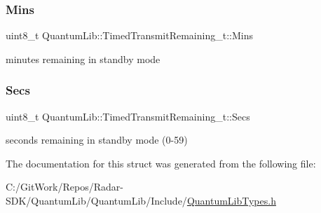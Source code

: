 \subsubsection{\texorpdfstring{Mins}{Mins}}
{\footnotesize\ttfamily uint8\+\_\+t Quantum\+Lib\+::\+Timed\+Transmit\+Remaining\+\_\+t\+::\+Mins}



minutes remaining in standby mode 

\mbox{\label{struct_quantum_lib_1_1_timed_transmit_remaining__t_ac84e3bd9617a6575140a535442a25b7c}} 
\subsubsection{\texorpdfstring{Secs}{Secs}}
{\footnotesize\ttfamily uint8\+\_\+t Quantum\+Lib\+::\+Timed\+Transmit\+Remaining\+\_\+t\+::\+Secs}



seconds remaining in standby mode (0-\/59) 



The documentation for this struct was generated from the following file\+:\begin{DoxyCompactItemize}
\item 
C\+:/\+Git\+Work/\+Repos/\+Radar-\/\+S\+D\+K/\+Quantum\+Lib/\+Quantum\+Lib/\+Include/\mbox{\hyperlink{_quantum_lib_types_8h}{Quantum\+Lib\+Types.\+h}}\end{DoxyCompactItemize}
